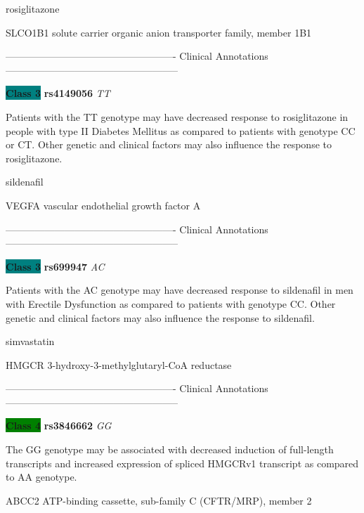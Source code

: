 \documentclass{resume} %
\begin{document}
\begin{rSection}{ rosiglitazone }
\begin{rSubsection}{ SLCO1B1 }{ solute carrier organic anion transporter family, member 1B1 }{}{}
\item[] ---------------------------------------------------- Clinical Annotations -----------------------------------------------------\newline
\item \textbf{\colorbox{teal} {Class 3}} \textbf{ rs4149056 } \textit{ TT }
\item[] Patients with the TT genotype may have decreased response to rosiglitazone in people with type II Diabetes Mellitus as compared to patients with genotype CC or CT. Other genetic and clinical factors may also influence the response to rosiglitazone.
\end{rSubsection}

\end{rSection}\begin{rSection}{ sildenafil }
\item[]

\begin{rSubsection}{ VEGFA }{ vascular endothelial growth factor A }{}{}
\item[]

\item[] ---------------------------------------------------- Clinical Annotations -----------------------------------------------------\newline
\item \textbf{\colorbox{teal} {Class 3}} \textbf{ rs699947 } \textit{ AC }
\item[] Patients with the AC genotype may have decreased response to sildenafil in men with Erectile Dysfunction as compared to patients with genotype CC. Other genetic and clinical factors may also influence the response to sildenafil.
\end{rSubsection}

\end{rSection}\begin{rSection}{ simvastatin }
\item[]

\begin{rSubsection}{ HMGCR }{ 3-hydroxy-3-methylglutaryl-CoA reductase }{}{}
\item[]

\item[] ---------------------------------------------------- Clinical Annotations -----------------------------------------------------\newline
\item \textbf{\colorbox{green} {Class 4}} \textbf{ rs3846662 } \textit{ GG }
\item[] The GG genotype may be associated with decreased induction of full-length transcripts and increased expression of spliced HMGCRv1 transcript  as compared to AA genotype.
\end{rSubsection}\begin{rSubsection}{ ABCC2 }{ ATP-binding cassette, sub-family C (CFTR/MRP), member 2 }{}{}
\item[]


\end{rSubsection}
\end{rSection}
\end{document}

